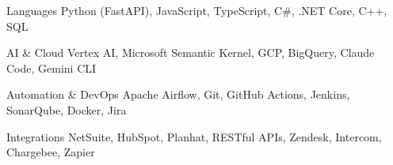 
\begin{cvskills}

  \cvskill
    {Languages}
    {Python (FastAPI), JavaScript, TypeScript, C\#, .NET Core, C++, SQL}

  \cvskill
    {AI \& Cloud}
    {Vertex AI, Microsoft Semantic Kernel, GCP, BigQuery, Claude Code, Gemini CLI}

  \cvskill
    {Automation \& DevOps}
    {Apache Airflow, Git, GitHub Actions, Jenkins, SonarQube, Docker, Jira}

  \cvskill
    {Integrations}
    {NetSuite, HubSpot, Planhat, RESTful APIs, Zendesk, Intercom, Chargebee, Zapier}

\end{cvskills}